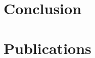 

\section{Conclusion} %
\label{sec:cache_conclusion}

\lipsum


\section{Publications} %
\label{sec:cache_publications}


